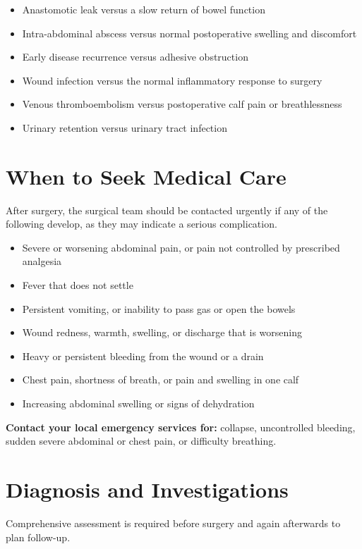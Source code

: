 \begin{itemize}
    \item Anastomotic leak versus a slow return of bowel function
    \item Intra-abdominal abscess versus normal postoperative swelling and discomfort
    \item Early disease recurrence versus adhesive obstruction
    \item Wound infection versus the normal inflammatory response to surgery
    \item Venous thromboembolism versus postoperative calf pain or breathlessness
    \item Urinary retention versus urinary tract infection
\end{itemize}

\section*{When to Seek Medical Care}
After surgery, the surgical team should be contacted urgently if any of the following develop, as they may indicate a serious complication.

\begin{itemize}
    \item Severe or worsening abdominal pain, or pain not controlled by prescribed analgesia
    \item Fever that does not settle
    \item Persistent vomiting, or inability to pass gas or open the bowels
    \item Wound redness, warmth, swelling, or discharge that is worsening
    \item Heavy or persistent bleeding from the wound or a drain
    \item Chest pain, shortness of breath, or pain and swelling in one calf
    \item Increasing abdominal swelling or signs of dehydration
\end{itemize}

\textbf{Contact your local emergency services for:} collapse, uncontrolled bleeding, sudden severe abdominal or chest pain, or difficulty breathing.

\section*{Diagnosis and Investigations}
Comprehensive assessment is required before surgery and again afterwards to plan follow-up.

